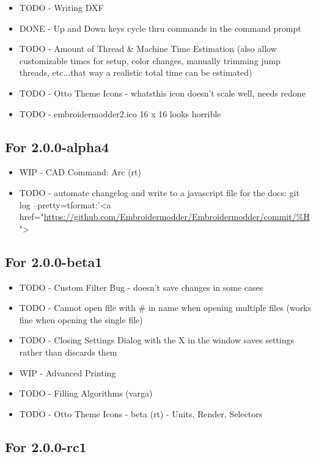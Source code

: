 \documentclass{report}
\begin{document}
\begin{itemize}
\item TODO - Writing DXF
\item DONE - Up and Down keys cycle thru commands in the command prompt
\item TODO - Amount of Thread \& Machine Time Estimation (also allow customizable times for setup, color changes, manually trimming jump threads, etc...that way a realistic total time can be estimated)
\item TODO - Otto Theme Icons - whatsthis icon doesn't scale well, needs redone
\item TODO - embroidermodder2.ico 16 x 16 looks horrible
\end{itemize}

\subsection{For 2.0.0-alpha4}

\begin{itemize}
\item WIP - CAD Command: Arc (rt)
\item TODO - automate changelog and write to a javascript file for the docs: git log --pretty=tformat:'<a href="\url{https://github.com/Embroidermodder/Embroidermodder/commit/%H}">%
\end{itemize}

\subsection{For 2.0.0-beta1}

\begin{itemize}
\item TODO - Custom Filter Bug - doesn't save changes in some cases
\item TODO - Cannot open file with \# in name when opening multiple files (works fine when opening the single file)
\item TODO - Closing Settings Dialog with the X in the window saves settings rather than discards them
\item WIP - Advanced Printing
\item TODO - Filling Algorithms (varga)
\item TODO - Otto Theme Icons - beta (rt) - Units, Render, Selectors
\end{itemize}

\subsection{For 2.0.0-rc1}
\end{document}
